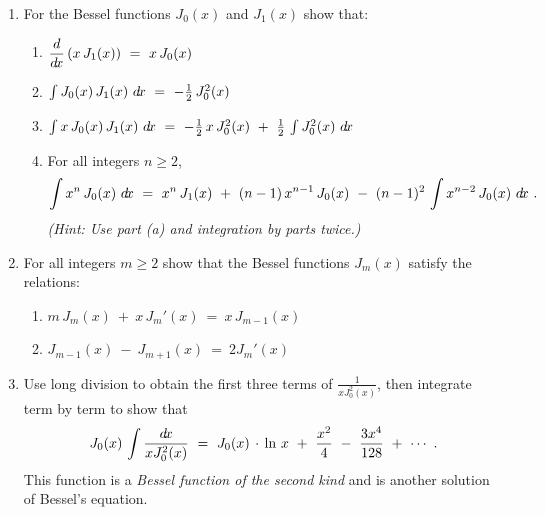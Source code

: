 {\begin{enumerate}[\bfseries 1.]
 \item\label{exer:besselderiv} For the Bessel functions $J_0(x)$ and $J_1(x)$
  show that:
\begin{enumerate}[\bfseries (a)]
\item $\dfrac{d}{d\!x}\,(x\,J_1(x)) ~=~ x\,J_0(x)$
\item $\int J_0(x)\,J_1(x)~d\!x ~=~ -\frac{1}{2}\,J_0^2(x)$
\item $\int x\,J_0(x)\,J_1(x)~d\!x ~=~ -\frac{1}{2}\,x\,J_0^2(x) ~+~
\frac{1}{2}\,\int J_0^2(x)~d\!x$
\item For all integers $n\ge 2$,
\[
\int x^n\,J_0(x)~d\!x ~=~ x^n\,J_1(x) ~+~ (n-1)\,x^{n-1}\,J_0(x) ~-~
(n-1)^2\,\int x^{n-2}\,J_0(x)~d\!x ~.
\]
\emph{(Hint: Use part (a) and integration by parts twice.)}
\end{enumerate}
 \item For all integers $m\ge 2$ show that the Bessel functions $J_m(x)$
  satisfy the relations:
\begin{enumerate}[\bfseries (a)]
\item $m\,J_m(x) ~+~ x\,J_m'(x) ~=~ x\,J_{m-1}(x)$
\item $J_{m-1}(x) ~-~ J_{m+1}(x) ~=~ 2J_{m}'(x)$
\end{enumerate}
 \item Use long division to obtain the first three terms of
  $\frac{1}{x J_0^2(x)}$, then integrate term by term to show that
\[
J_0(x)\,\int \frac{d\!x}{x J_0^2(x)} ~=~ J_0(x)\,\cdot\,\ln\,x ~+~ \frac{x^2}{4}
~-~ \frac{3x^4}{128} ~+~ \cdots ~.
\]
This function is a \emph{Bessel function of the second kind} and is another
solution of Bessel's equation.
\end{enumerate}
}
\newpage
